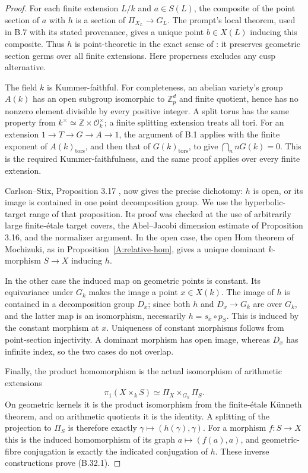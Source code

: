 \documentclass[11pt,oneside]{article}
\begin{document}
\begin{proof}
For each finite extension $L/k$ and $a\in S(L)$,
the composite of the point section of $a$ with $h$
is a section of $\Pi_{X_L}\to G_L$.
The prompt's local theorem, used in B.7 with its
stated provenance, gives a unique point
$b\in X(L)$ inducing this composite. Thus $h$ is
point-theoretic in the exact sense of
\cite[Definition 3.2]{B_CarlsonStix}: it preserves
geometric section germs over all finite extensions.
Here properness excludes any cusp alternative.

The field $k$ is Kummer-faithful. For completeness,
an abelian variety's group $A(k)$ has an open
subgroup isomorphic to $\mathbb Z_p^d$ and finite
quotient, hence has no nonzero element divisible
by every positive integer. A split torus has the
same property from
$k^\times\simeq\mathbb Z\times\mathcal O_k^\times$;
a finite splitting extension treats all tori.
For an extension $1\to T\to G\to A\to1$, the
argument of B.1 applies with the finite exponent
of $A(k)_{\mathrm{tors}}$, and then that of
$G(k)_{\mathrm{tors}}$, to give
$\bigcap_n nG(k)=0$. This is the required
Kummer-faithfulness, and the same proof applies
over every finite extension.

Carlson--Stix, Proposition 3.17
\cite{B_CarlsonStix}, now gives the precise
dichotomy: $h$ is open, or its image is contained
in one point decomposition group. We use the
hyperbolic-target range of that proposition.
Its proof was checked at the use of arbitrarily
large finite-\'etale target covers, the
Abel--Jacobi dimension estimate of Proposition 3.16,
and the normalizer argument.
In the open case, the open Hom theorem of
Mochizuki, as in Proposition~\ref{A:relative-hom}, gives a unique dominant
$k$-morphism $S\to X$ inducing $h$.

In the other case the induced map on geometric
points is constant. Its equivariance under
$G_k$ makes the image a point $x\in X(k)$.
The image of $h$ is contained in a decomposition
group $D_x$; since both $h$ and $D_x\to G_k$
are over $G_k$, and the latter map is an
isomorphism, necessarily
$h=s_x\circ p_S$. This is induced by the
constant morphism at $x$.
Uniqueness of constant morphisms follows from
point-section injectivity. A dominant morphism
has open image, whereas $D_x$ has infinite
index, so the two cases do not overlap.

Finally, the product homomorphism is the actual
isomorphism of arithmetic extensions
\[
 \pi_1(X\times_k S)
       \simeq \Pi_X\times_{G_k}\Pi_S.
\]
On geometric kernels it is the product
isomorphism from the finite-\'etale K\"unneth
theorem, and on arithmetic quotients it is the
identity. A splitting of the projection to
$\Pi_S$ is therefore exactly
$\gamma\mapsto(h(\gamma),\gamma)$.
For a morphism $f:S\to X$ this is the induced
homomorphism of its graph
$a\mapsto(f(a),a)$, and geometric-fibre
conjugation is exactly the indicated conjugation
of $h$. These inverse constructions prove
(B.32.1).
\end{proof}
\end{document}
